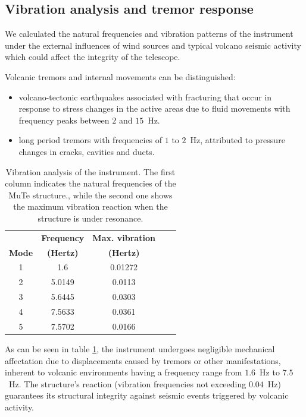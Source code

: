 \documentclass[letterpaper,11pt]{article}
\begin{document}
\subsection{Vibration analysis and tremor response}
We calculated the natural frequencies and vibration patterns of the instrument under the external influences of wind sources and typical volcano seismic activity which could affect the integrity of the telescope. 

Volcanic tremors and internal movements can be distinguished\cite{mcnutt1992volcanic,londono2001spectral,langer2006automatic,chouet2003volcano}: 
\begin{itemize}
    \item volcano-tectonic earthquakes associated with fracturing that occur in response to stress changes in the active areas due to fluid movements with frequency peaks between $2$ and $15$~Hz.
    \item long period tremors with frequencies of $1$ to $2$~Hz, attributed to pressure changes in cracks, cavities and ducts. 
\end{itemize}
\begin{table}[htb]
\begin{center}
\begin{tabular}{ccccc}
\hline
& {\bf Frequency}  & {\bf Max. vibration}\\
{\bf Mode}  & {\bf (Hertz)}  & {\bf (Hertz)} \\
\hline
1 & 1.6 & 0.01272\\ 
2  & 5.0149  & 0.0113 \\
3  & 5.6445  & 0.0303 \\
4  & 7.5633  & 0.0361 \\
5  & 7.5702  & 0.0166 \\
\hline
\end{tabular}
\end{center}
\caption{Vibration analysis of the instrument. The first column indicates the natural frequencies of the MuTe structure., while the second one shows the maximum vibration reaction when the structure is under resonance.}
\label{Table_nat_frec1}
\end{table}

As can be seen in table \ref{Table_nat_frec1}, the instrument undergoes negligible mechanical affectation due to displacements caused by tremors or other manifestations, inherent to volcanic environments having a frequency range from $1.6$~Hz to $7.5$~Hz. The structure's reaction (vibration frequencies not exceeding $0.04$~Hz) guarantees its structural integrity against seismic events triggered by volcanic activity. 
\end{document}
